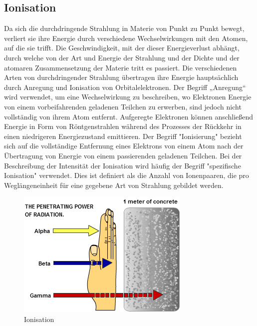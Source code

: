 {{\subsection{Ionisation}
Da sich die durchdringende Strahlung in Materie von Punkt zu Punkt bewegt, verliert sie ihre Energie durch verschiedene Wechselwirkungen mit den Atomen, auf die sie trifft.
Die Geschwindigkeit, mit der dieser Energieverlust abhängt, durch welche von der Art und Energie der Strahlung und der Dichte und der atomaren Zusammensetzung der Materie tritt es passiert.
Die verschiedenen Arten von durchdringender Strahlung übertragen ihre Energie hauptsächlich durch Anregung und Ionisation von Orbitalelektronen. Der Begriff „Anregung“ wird verwendet, um eine Wechselwirkung zu beschreiben, wo Elektronen Energie von einem vorbeifahrenden geladenen Teilchen zu erwerben, sind jedoch nicht vollständig von ihrem Atom entfernt. Aufgeregte Elektronen können anschließend Energie in Form von Röntgenstrahlen während des Prozesses der Rückkehr in einen niedrigeren Energiezustand emittieren. Der Begriff "Ionisierung" bezieht sich auf die vollständige Entfernung eines Elektrons von einem Atom nach der Übertragung von Energie von einem passierenden geladenen Teilchen. Bei der Beschreibung der Intensität der Ionisation wird häufig der Begriff "spezifische Ionisation" verwendet. Dies ist definiert als die Anzahl von Ionenpaaren, die pro Weglängeneinheit für eine gegebene Art von Strahlung gebildet werden.

\begin{figure}[htb]
  \centering  
  \includegraphics[scale=0.5]{img/Ionisation.png}
  \caption{Ionisation}
  \label{fig:Ionisation}
\end{figure}

}}
